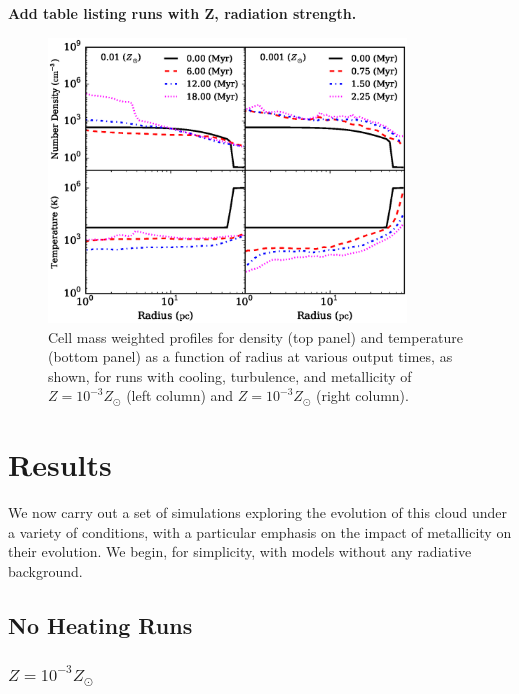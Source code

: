 \documentclass[useAMS,usenatbib]{mn2e}
\begin{document}
{\bf Add table listing runs with Z, radiation strength.}

% 


\begin{figure}
\begin{center}
\includegraphics[width=9.5cm]{Images/profile_panel}
\end{center}
\caption{\label{fig:profiles} Cell mass weighted profiles for 
density (top panel) and temperature (bottom panel) as a function of radius at various 
output times, as shown, for runs with cooling, turbulence, and metallicity of $Z=10^{-3}Z_\odot$
(left column) and $Z=10^{-3}Z_\odot$ (right column).}
\end{figure}

\section{Results}
\label{sec:results}

We now carry out a set of simulations exploring the evolution of this cloud under a variety of conditions, with a particular emphasis on the impact of metallicity on their evolution.  We begin, for simplicity, with models without any radiative background.


\subsection{No Heating Runs}

\subsubsection{$Z=10^{-3}Z_\odot$}
\end{document}
